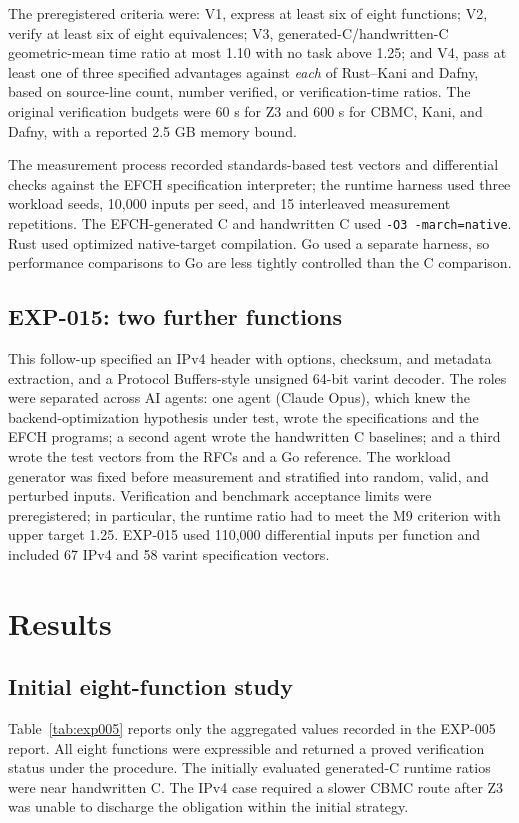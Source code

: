 \documentclass[10pt,twocolumn]{article}
\begin{document}
The preregistered criteria were: V1, express at least six of eight functions; V2, verify at least six of eight equivalences; V3, generated-C/handwritten-C geometric-mean time ratio at most 1.10 with no task above 1.25; and V4, pass at least one of three specified advantages against \emph{each} of Rust--Kani and Dafny, based on source-line count, number verified, or verification-time ratios. The original verification budgets were 60 s for Z3 and 600 s for CBMC, Kani, and Dafny, with a reported 2.5 GB memory bound.

The measurement process recorded standards-based test vectors and differential checks against the EFCH specification interpreter; the runtime harness used three workload seeds, 10,000 inputs per seed, and 15 interleaved measurement repetitions. The EFCH-generated C and handwritten C used \texttt{-O3 -march=native}. Rust used optimized native-target compilation. Go used a separate harness, so performance comparisons to Go are less tightly controlled than the C comparison.

\subsection{EXP-015: two further functions}
This follow-up specified an IPv4 header with options, checksum, and metadata extraction, and a Protocol Buffers-style unsigned 64-bit varint decoder. The roles were separated across AI agents: one agent (Claude Opus), which knew the backend-optimization hypothesis under test, wrote the specifications and the EFCH programs; a second agent wrote the handwritten C baselines; and a third wrote the test vectors from the RFCs and a Go reference. The workload generator was fixed before measurement and stratified into random, valid, and perturbed inputs. Verification and benchmark acceptance limits were preregistered; in particular, the runtime ratio had to meet the M9 criterion with upper target 1.25. EXP-015 used 110,000 differential inputs per function and included 67 IPv4 and 58 varint specification vectors.

\section{Results}
\subsection{Initial eight-function study}
Table~\ref{tab:exp005} reports only the aggregated values recorded in the EXP-005 report. All eight functions were expressible and returned a proved verification status under the procedure. The initially evaluated generated-C runtime ratios were near handwritten C. The IPv4 case required a slower CBMC route after Z3 was unable to discharge the obligation within the initial strategy.
\end{document}
